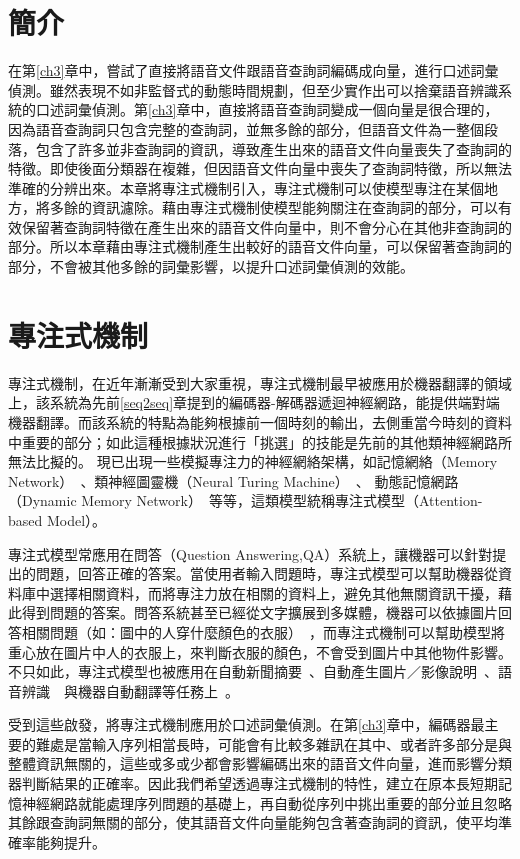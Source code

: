 \section{簡介}
在第\ref{ch3}章中，嘗試了直接將語音文件跟語音查詢詞編碼成向量，進行口述詞彙偵測。雖然表現不如非監督式的動態時間規劃，但至少實作出可以捨棄語音辨識系統的口述詞彙偵測。第\ref{ch3}章中，直接將語音查詢詞變成一個向量是很合理的，因為語音查詢詞只包含完整的查詢詞，並無多餘的部分，但語音文件為一整個段落，包含了許多並非查詢詞的資訊，導致產生出來的語音文件向量喪失了查詢詞的特徵。即使後面分類器在複雜，但因語音文件向量中喪失了查詢詞特徵，所以無法準確的分辨出來。本章將專注式機制引入，專注式機制可以使模型專注在某個地方，將多餘的資訊濾除。藉由專注式機制使模型能夠關注在查詢詞的部分，可以有效保留著查詢詞特徵在產生出來的語音文件向量中，則不會分心在其他非查詢詞的部分。所以本章藉由專注式機制產生出較好的語音文件向量，可以保留著查詢詞的部分，不會被其他多餘的詞彙影響，以提升口述詞彙偵測的效能。
\section{專注式機制}
專注式機制，在近年漸漸受到大家重視，專注式機制最早被應用於機器翻譯的領域上，該系統為先前\ref{seq2seq}章提到的編碼器-解碼器遞迴神經網路，能提供端對端機器翻譯。而該系統的特點為能夠根據前一個時刻的輸出，去側重當今時刻的資料中重要的部分；如此這種根據狀況進行「挑選」的技能是先前的其他類神經網路所無法比擬的。
現已出現一些模擬專注力的神經網絡架構，如記憶網絡（Memory
Network）~\cite{sukhbaatar2015end}、類神經圖靈機（Neural Turing
Machine）~\cite{graves2014neural}、 動態記憶網路（Dynamic
Memory
Network）~\cite{kumar2015ask}等等，這類模型統稱專注式模型（Attention-based
Model）。

專注式模型常應用在問答（Question
Answering,QA）系統上，讓機器可以針對提出的問題，回答正確的答案。當使用者輸入問題時，專注式模型可以幫助機器從資料庫中選擇相關資料，而將專注力放在相關的資料上，避免其他無關資訊干擾，藉此得到問題的答案。問答系統甚至已經從文字擴展到多媒體，機器可以依據圖片回答相關問題（如：圖中的人穿什麼顏色的衣服）~\cite{agrawal2015vqa}，而專注式機制可以幫助模型將重心放在圖片中人的衣服上，來判斷衣服的顏色，不會受到圖片中其他物件影響。不只如此，專注式模型也被應用在自動新聞摘要~\cite{rush2015neural}、自動產生圖片／影像說明~\cite{xu2015show}、語音辨識~\cite{chan2016listen}~與機器自動翻譯等任務上~\cite{bahdanau2014neural}。

受到這些啟發，將專注式機制應用於口述詞彙偵測。在第\ref{ch3}章中，編碼器最主要的難處是當輸入序列相當長時，可能會有比較多雜訊在其中、或者許多部分是與整體資訊無關的，這些或多或少都會影響編碼出來的語音文件向量，進而影響分類器判斷結果的正確率。因此我們希望透過專注式機制的特性，建立在原本長短期記憶神經網路就能處理序列問題的基礎上，再自動從序列中挑出重要的部分並且忽略其餘跟查詢詞無關的部分，使其語音文件向量能夠包含著查詢詞的資訊，使平均準確率能夠提升。
